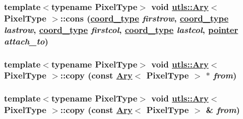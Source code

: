 \hypertarget{structutls_1_1Ary_413d558b47b4d16b13ed54809d04e41a}{
\subsubsection[cons]{\setlength{\rightskip}{0pt plus 5cm}template$<$typename Pixel\-Type$>$ void \hyperlink{structutls_1_1Ary}{utls::Ary}$<$ Pixel\-Type $>$::cons (\hyperlink{structutls_1_1Ary_907420b899d180bd0ae87c3995316f18}{coord\_\-type} {\em firstrow}, \hyperlink{structutls_1_1Ary_907420b899d180bd0ae87c3995316f18}{coord\_\-type} {\em lastrow}, \hyperlink{structutls_1_1Ary_907420b899d180bd0ae87c3995316f18}{coord\_\-type} {\em firstcol}, \hyperlink{structutls_1_1Ary_907420b899d180bd0ae87c3995316f18}{coord\_\-type} {\em lastcol}, \hyperlink{structutls_1_1Ary_9eb735fe995ca9b5faaef9b176a08583}{pointer} {\em attach\_\-to})}}
\label{structutls_1_1Ary_413d558b47b4d16b13ed54809d04e41a}


\hypertarget{structutls_1_1Ary_c0025d5b957bd2016bd0b859190029a0}{
\subsubsection[copy]{\setlength{\rightskip}{0pt plus 5cm}template$<$typename Pixel\-Type$>$ void \hyperlink{structutls_1_1Ary}{utls::Ary}$<$ Pixel\-Type $>$::copy (const \hyperlink{structutls_1_1Ary}{Ary}$<$ Pixel\-Type $>$ $\ast$ {\em from})}}
\label{structutls_1_1Ary_c0025d5b957bd2016bd0b859190029a0}


\hypertarget{structutls_1_1Ary_960a605e93700bba86d9828b0a26ee68}{
\subsubsection[copy]{\setlength{\rightskip}{0pt plus 5cm}template$<$typename Pixel\-Type$>$ void \hyperlink{structutls_1_1Ary}{utls::Ary}$<$ Pixel\-Type $>$::copy (const \hyperlink{structutls_1_1Ary}{Ary}$<$ Pixel\-Type $>$ \& {\em from})}}
\label{structutls_1_1Ary_960a605e93700bba86d9828b0a26ee68}


